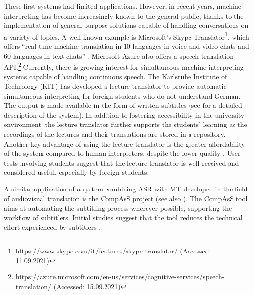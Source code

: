 These first systems had limited applications. However, in recent years, machine interpreting has become increasingly known to the general public, thanks to the implementation of general-purpose solutions capable of handling conversations on a variety of topics. A well-known example is Microsoft's Skype Translator\footnote{\url{https://www.skype.com/it/features/skype-translator/} (Accessed: 11.09.2021)}, which offers ``real-time machine translation in 10 languages in voice and video chats and 60 languages in text chats'' \citep[21]{hoberg2021dialogue}. Microsoft Azure also offers a speech translation API.\footnote{\url{https://azure.microsoft.com/en-us/services/cognitive-services/speech-translation/} (Accessed: 15.09.2021)}
Currently, there is growing interest for simultaneous machine interpreting systems capable of handling continuous speech. The Karlsruhe Institute of Technology (KIT) has developed a lecture translator to provide automatic simultaneous interpreting for foreign students who do not understand German. The output is made available in the form of written subtitles (see \citealt{dessloch2018kit} for a detailed description of the system). In addition to fostering accessibility in the university environment, the lecture translator further supports the students' learning as the recordings of the lectures and their translations are stored in a repository. Another key advantage of using the lecture translator is the greater affordability of the system compared to human interpreters, despite the lower quality \citep[89]{dessloch2018kit}. User tests involving students suggest that the lecture translator is well received and considered useful, especially by foreign students.

\begin{sloppypar}
A similar application of a system combining ASR with MT developed in the field of audiovisual translation is the CompAsS project (see also ). The \mbox{CompAsS} tool aims at automating the subtitling process wherever possible, supporting the workflow of subtitlers. Initial studies suggest that the tool reduces the technical effort experienced by subtitlers \citep{tardel_automatization_2018,tardel_attention_2021}.
\end{sloppypar}

